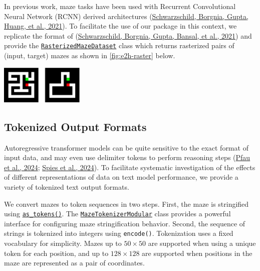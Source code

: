 \documentclass[10pt,a4paper,onecolumn]{article}
\let\origfigure\figure
\let\endorigfigure\endfigure
\renewenvironment{figure}[1][2] {
    \expandafter\origfigure\expandafter[H]
} {
    \endorigfigure
}
\begin{document}
In previous work, maze tasks have been used with Recurrent Convolutional
Neural Network (RCNN) derived architectures
(\protect\hyperlink{ref-deepthinking}{Schwarzschild, Borgnia, Gupta,
Huang, et al., 2021}). To facilitate the use of our package in this
context, we replicate the format of
(\protect\hyperlink{ref-easy_to_hard}{Schwarzschild, Borgnia, Gupta,
Bansal, et al., 2021}) and provide the
\href{https://understanding-search.github.io/maze-dataset/maze_dataset/dataset/rasterized.html\#RasterizedMazeDataset}{\texttt{RasterizedMazeDataset}}
class which returns rasterized pairs of (input, target) mazes as shown
in \autoref{fig:e2h-raster} below.

\begin{figure}
\hypertarget{fig:e2h-raster}{%
\centering
\includegraphics[width=0.3\textwidth,height=\textheight]{figures/maze-raster-input-target.pdf}
\caption{Input is the rasterized maze without the path marked (left),
and provide as a target the maze with all but the correct path removed
(right). Configuration options exist to adjust whether endpoints are
included and if empty cells should be filled in.}\label{fig:e2h-raster}
}
\end{figure}

\hypertarget{sec:tokenized-output-formats}{%
\subsection{Tokenized Output
Formats}\label{sec:tokenized-output-formats}}

Autoregressive transformer models can be quite sensitive to the exact
format of input data, and may even use delimiter tokens to perform
reasoning steps (\protect\hyperlink{ref-pfau2024dotbydot}{Pfau et al.,
2024}; \protect\hyperlink{ref-spies2024causalworldmodels}{Spies et al.,
2024}). To facilitate systematic investigation of the effects of
different representations of data on text model performance, we provide
a variety of tokenized text output formats.

We convert mazes to token sequences in two steps. First, the maze is
stringified using
\href{https://understanding-search.github.io/maze-dataset/maze_dataset.html\#MazeDataset.as_tokens}{\texttt{as\_tokens()}}.
The
\href{https://understanding-search.github.io/maze-dataset/maze_dataset/tokenization.html\#MazeTokenizerModular}{\texttt{MazeTokenizerModular}}
class provides a powerful interface for configuring maze stringification
behavior. Second, the sequence of strings is tokenized into integers
using \texttt{encode()}. Tokenization uses a fixed vocabulary for
simplicity. Mazes up to \(50 \times 50\) are supported when using a
unique token for each position, and up to \(128 \times 128\) are
supported when positions in the maze are represented as a pair of
coordinates.
\end{document}
